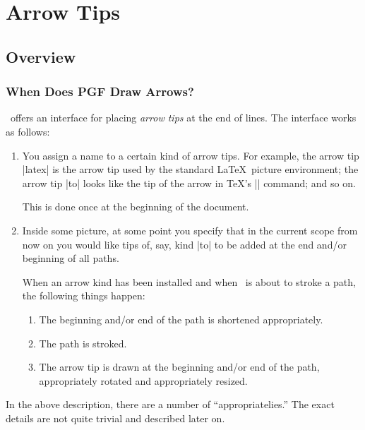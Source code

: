 %


\section{Arrow Tips}
\label{section-arrows}


\subsection{Overview}

\subsubsection{When Does PGF Draw Arrows?}

\pgfname\ offers an interface for placing \emph{arrow tips} at the end
of lines. The interface works as follows:

\begin{enumerate}
\item
  You assign a name to a certain kind of arrow tips. For example, the
  arrow tip |latex| is the arrow tip used by the standard \LaTeX\
  picture environment; the arrow tip |to| looks like the tip of the
  arrow in \TeX's |\to| command; and so on.

  This is done once at the beginning of the document.
\item
  Inside some picture, at some point you specify that in the current
  scope from now on you would like tips of, say, kind |to| to be added
  at the end and/or beginning of all paths.

  When an arrow kind has been installed and when \pgfname\ is about to
  stroke a path, the following things happen:
  \begin{enumerate}
  \item
    The beginning and/or end of the path is shortened appropriately.
  \item
    The path is stroked.
  \item
    The arrow tip is drawn at the beginning and/or end of the path,
    appropriately rotated and appropriately resized.
  \end{enumerate}
\end{enumerate}

In the above description, there are a number of ``appropriatelies.''
The exact details are not quite trivial and described later on.

